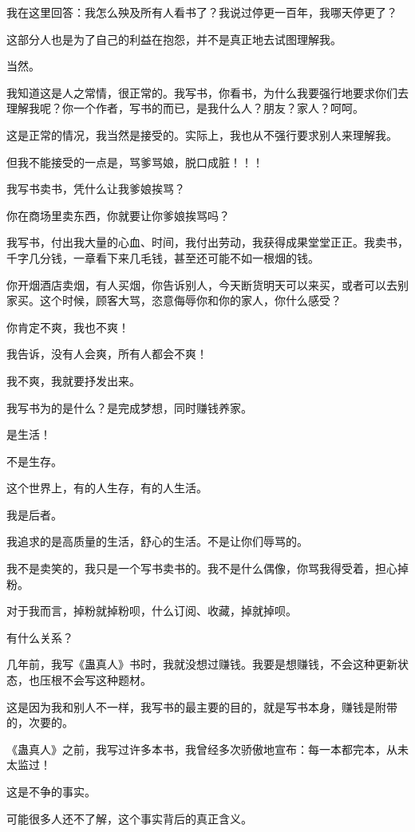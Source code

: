 \begin{this_body}
我在这里回答：我怎么殃及所有人看书了？我说过停更一百年，我哪天停更了？

这部分人也是为了自己的利益在抱怨，并不是真正地去试图理解我。

当然。

我知道这是人之常情，很正常的。我写书，你看书，为什么我要强行地要求你们去理解我呢？你一个作者，写书的而已，是我什么人？朋友？家人？呵呵。

这是正常的情况，我当然是接受的。实际上，我也从不强行要求别人来理解我。

但我不能接受的一点是，骂爹骂娘，脱口成脏！！！

我写书卖书，凭什么让我爹娘挨骂？

你在商场里卖东西，你就要让你爹娘挨骂吗？

我写书，付出我大量的心血、时间，我付出劳动，我获得成果堂堂正正。我卖书，千字几分钱，一章看下来几毛钱，甚至还可能不如一根烟的钱。

你开烟酒店卖烟，有人买烟，你告诉别人，今天断货明天可以来买，或者可以去别家买。这个时候，顾客大骂，恣意侮辱你和你的家人，你什么感受？

你肯定不爽，我也不爽！

我告诉，没有人会爽，所有人都会不爽！

我不爽，我就要抒发出来。

我写书为的是什么？是完成梦想，同时赚钱养家。

是生活！

不是生存。

这个世界上，有的人生存，有的人生活。

我是后者。

我追求的是高质量的生活，舒心的生活。不是让你们辱骂的。

我不是卖笑的，我只是一个写书卖书的。我不是什么偶像，你骂我得受着，担心掉粉。

对于我而言，掉粉就掉粉呗，什么订阅、收藏，掉就掉呗。

有什么关系？

几年前，我写《蛊真人》书时，我就没想过赚钱。我要是想赚钱，不会这种更新状态，也压根不会写这种题材。

这是因为我和别人不一样，我写书的最主要的目的，就是写书本身，赚钱是附带的，次要的。

《蛊真人》之前，我写过许多本书，我曾经多次骄傲地宣布：每一本都完本，从未太监过！

这是不争的事实。

可能很多人还不了解，这个事实背后的真正含义。


\end{this_body}
